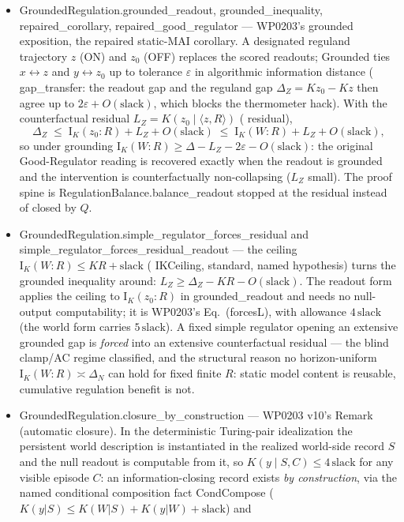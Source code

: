 \documentclass[11pt,a4paper]{article}
\newcommand{\lean}[1]{{\ttfamily\small
  \let\leanunderscore\_\def\_{\leanunderscore\allowbreak}#1}}
\newcommand{\Ik}{\mathrm{I}_K}
\begin{document}
\begin{itemize}[leftmargin=1.4em,itemsep=1pt]
\item \lean{GroundedRegulation.grounded\_readout}, \lean{grounded\_inequality},
\lean{repaired\_corollary}, \lean{repaired\_good\_regulator} --- WP0203's grounded
exposition, the repaired static-MAI corollary. A designated reguland trajectory $z$ (ON) and
$z_0$ (OFF) replaces the scored readouts; \lean{Grounded} ties $x\leftrightarrow z$ and
$y\leftrightarrow z_0$ up to tolerance $\varepsilon$ in algorithmic information distance
(\lean{gap\_transfer}: the readout gap and the reguland gap $\Delta_Z=K z_0-K z$ then agree
up to $2\varepsilon+O(\mathrm{slack})$, which blocks the thermometer hack). With the
counterfactual residual $L_Z=K(z_0\mid\langle z,R\rangle)$ (\lean{residual}),
\[
  \Delta_Z\;\le\;\Ik(z_0{:}R)+L_Z+O(\mathrm{slack})\;\le\;\Ik(W{:}R)+L_Z+O(\mathrm{slack}),
\]
so under grounding $\Ik(W{:}R)\ge\Delta-L_Z-2\varepsilon-O(\mathrm{slack})$: the original
Good-Regulator reading is recovered exactly when the readout is grounded and the
intervention is counterfactually non-collapsing ($L_Z$ small). The proof spine is
\lean{RegulationBalance.balance\_readout} stopped at the residual instead of closed by $Q$.
\item \lean{GroundedRegulation.simple\_regulator\_forces\_residual} and
\lean{simple\_regulator\_forces\_residual\_readout} --- the ceiling
$\Ik(W{:}R)\le K R+\mathrm{slack}$ (\lean{IKCeiling}, standard, named hypothesis) turns the
grounded inequality around: $L_Z\ge\Delta_Z-K R-O(\mathrm{slack})$. The readout form applies
the ceiling to $\Ik(z_0{:}R)$ in \lean{grounded\_readout} and needs no null-output
computability; it is WP0203's Eq.~(forcesL), with allowance $4\,\mathrm{slack}$ (the world
form carries $5\,\mathrm{slack}$). A fixed simple regulator
opening an extensive grounded gap is \emph{forced} into an extensive counterfactual
residual --- the blind clamp/AC regime classified, and the structural reason no
horizon-uniform $\Ik(W{:}R)\asymp\Delta_N$ can hold for fixed finite $R$: static model
content is reusable, cumulative regulation benefit is not.
\item \lean{GroundedRegulation.closure\_by\_construction} --- WP0203 v10's Remark
(automatic closure). In the deterministic Turing-pair idealization the persistent world
description is instantiated in the realized world-side record $S$ and the null readout is
computable from it, so $K(y\mid S,C)\le 4\,\mathrm{slack}$ for any visible episode $C$: an
information-closing record exists \emph{by construction}, via the named conditional
composition fact \lean{CondCompose} ($K(y|S)\le K(W|S)+K(y|W)+\mathrm{slack}$) and

\end{itemize}
\end{document}
